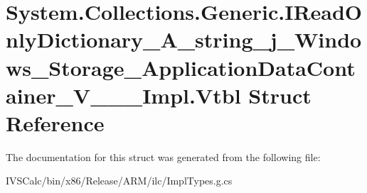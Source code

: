 \hypertarget{struct_system_1_1_collections_1_1_generic_1_1_i_read_only_dictionary___a__string__j___windows___bd90eb43cce97e01ac47723d9c98ce6d}{}\section{System.\+Collections.\+Generic.\+I\+Read\+Only\+Dictionary\+\_\+\+A\+\_\+string\+\_\+j\+\_\+\+Windows\+\_\+\+Storage\+\_\+\+Application\+Data\+Container\+\_\+\+V\+\_\+\+\_\+\+\_\+\+Impl.\+Vtbl Struct Reference}
\label{struct_system_1_1_collections_1_1_generic_1_1_i_read_only_dictionary___a__string__j___windows___bd90eb43cce97e01ac47723d9c98ce6d}


The documentation for this struct was generated from the following file\+:\begin{DoxyCompactItemize}
\item 
I\+V\+S\+Calc/bin/x86/\+Release/\+A\+R\+M/ilc/Impl\+Types.\+g.\+cs\end{DoxyCompactItemize}
